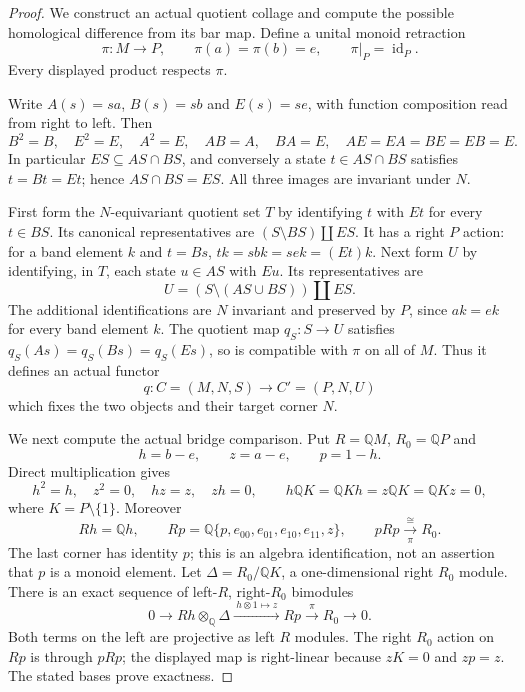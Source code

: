 \begin{proof}
We construct an actual quotient collage and compute the possible
homological difference from its bar map.  Define a unital monoid
retraction
\[
 \pi:M\longrightarrow P,\qquad \pi(a)=\pi(b)=e,
 \qquad \pi|_P=\operatorname{id}_P.
\]
Every displayed product respects $\pi$.

Write $A(s)=sa$, $B(s)=sb$ and $E(s)=se$, with function
composition read from right to left.  Then
\[
 B^2=B,\quad E^2=E,\quad A^2=E,\quad AB=A,\quad BA=E,
 \quad AE=EA=BE=EB=E.
\]
In particular $ES\subseteq AS\cap BS$, and conversely a state
$t\in AS\cap BS$ satisfies $t=Bt=Et$; hence
$AS\cap BS=ES$.  All three images are invariant under $N$.

First form the $N$-equivariant quotient set $T$ by identifying
$t$ with $Et$ for every $t\in BS$.  Its canonical representatives
are $(S\setminus BS)\amalg ES$.  It has a right $P$ action:
for a band element $k$ and $t=Bs$,
$tk=sbk=sek=(Et)k$.  Next form $U$ by identifying, in $T$,
each state $u\in AS$ with $Eu$.  Its representatives are
\[
 U=(S\setminus(AS\cup BS))\amalg ES.
\]
The additional identifications are $N$ invariant and preserved
by $P$, since $ak=ek$ for every band element $k$.
The quotient map $q_S:S\to U$ satisfies
$q_S(As)=q_S(Bs)=q_S(Es)$, so is compatible with $\pi$ on
all of $M$.  Thus it defines an actual functor
\[
 q:C=(M,N,S)\longrightarrow C'=(P,N,U)
\]
which fixes the two objects and their target corner $N$.

We next compute the actual bridge comparison.  Put
$R=\mathbb QM$, $R_0=\mathbb QP$ and
\[
 h=b-e,\qquad z=a-e,\qquad p=1-h.
\]
Direct multiplication gives
\[
 h^2=h,\quad z^2=0,\quad hz=z,\quad zh=0,
 \qquad h\mathbb QK=\mathbb QKh=z\mathbb QK=\mathbb QKz=0,
\]
where $K=P\setminus\{1\}$.  Moreover
\[
 Rh=\mathbb Qh,\qquad
 Rp=\mathbb Q\{p,e_{00},e_{01},e_{10},e_{11},z\},
 \qquad pRp\xrightarrow[\pi]{\cong}R_0.
\]
The last corner has identity $p$; this is an algebra identification,
not an assertion that $p$ is a monoid element.  Let
$\Delta=R_0/\mathbb QK$, a one-dimensional right $R_0$ module.
There is an exact sequence of left-$R$, right-$R_0$ bimodules
\[
 0\longrightarrow Rh\otimes_{\mathbb Q}\Delta
   \xrightarrow{\ h\otimes1\mapsto z\ }Rp
   \xrightarrow{\pi}R_0\longrightarrow0.                 \tag{*}
\]
Both terms on the left are projective as left $R$ modules.
The right $R_0$ action on $Rp$ is through $pRp$; the displayed
map is right-linear because $zK=0$ and $zp=z$.
The stated bases prove exactness.


\end{proof}
